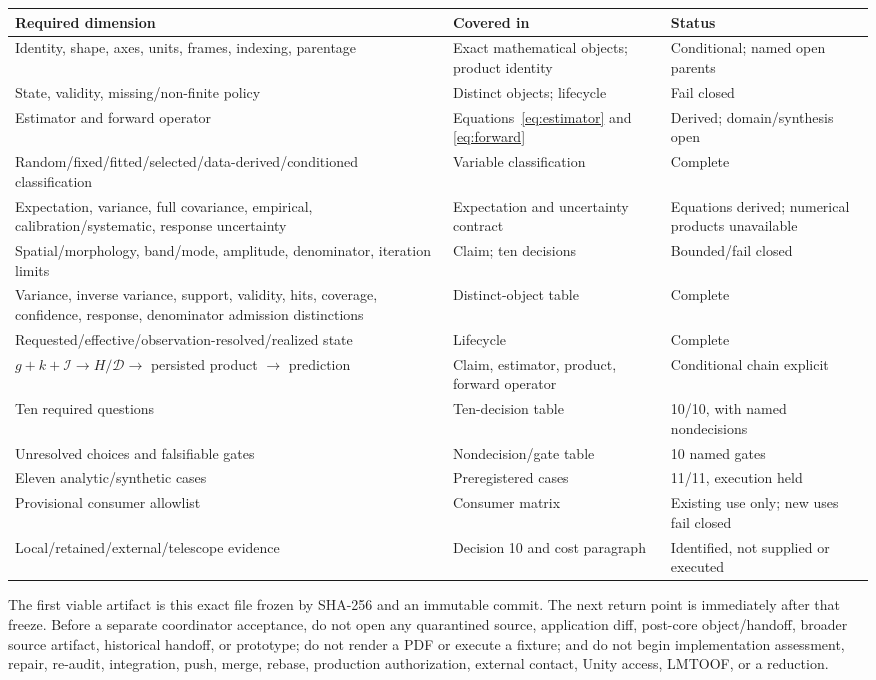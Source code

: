 \documentclass[11pt]{article}
\begin{document}
\begin{longtable}{@{}L{0.34\textwidth}L{0.23\textwidth}L{0.34\textwidth}@{}}
\toprule
Required dimension & Covered in & Status \\
\midrule
\endhead
Identity, shape, axes, units, frames, indexing, parentage & Exact mathematical
objects; product identity & Conditional; named open parents \\
State, validity, missing/non-finite policy & Distinct objects; lifecycle &
Fail closed \\
Estimator and forward operator & Equations~\ref{eq:estimator} and
\ref{eq:forward} & Derived; domain/synthesis open \\
Random/fixed/fitted/selected/data-derived/conditioned classification & Variable
classification & Complete \\
Expectation, variance, full covariance, empirical, calibration/systematic,
response uncertainty & Expectation and uncertainty contract & Equations
derived; numerical products unavailable \\
Spatial/morphology, band/mode, amplitude, denominator, iteration limits & Claim;
ten decisions & Bounded/fail closed \\
Variance, inverse variance, support, validity, hits, coverage, confidence,
response, denominator admission distinctions & Distinct-object table &
Complete \\
Requested/effective/observation-resolved/realized state & Lifecycle & Complete \\
$g+k+\mathcal I\to H/\mathcal D\to$ persisted product $\to$ prediction & Claim,
estimator, product, forward operator & Conditional chain explicit \\
Ten required questions & Ten-decision table & 10/10, with named nondecisions \\
Unresolved choices and falsifiable gates & Nondecision/gate table & 10 named gates \\
Eleven analytic/synthetic cases & Preregistered cases & 11/11, execution held \\
Provisional consumer allowlist & Consumer matrix & Existing use only; new uses
fail closed \\
Local/retained/external/telescope evidence & Decision 10 and cost paragraph &
Identified, not supplied or executed \\
\bottomrule
\end{longtable}

The first viable artifact is this exact file frozen by SHA-256 and an immutable
commit.  The next return point is immediately after that freeze.  Before a
separate coordinator acceptance, do not open any quarantined source,
application diff, post-core object/handoff, broader source artifact,
historical handoff, or prototype; do not render a PDF or execute a fixture;
and do not begin implementation assessment, repair, re-audit, integration,
push, merge, rebase, production authorization, external contact, Unity access,
LMTOOF, or a reduction.
\end{document}
